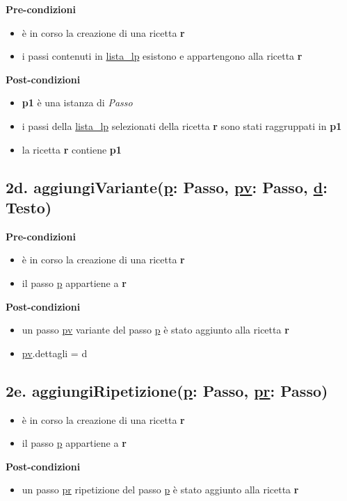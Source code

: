 \documentclass[12pt]{extarticle}
\begin{document}
\textbf{Pre-condizioni}
\begin{itemize}
  \item è in corso la creazione di una ricetta  \textbf{r}
  \item i passi contenuti in \underline{lista\_lp} esistono e appartengono alla ricetta \textbf{r}
\end{itemize}
\textbf{Post-condizioni}
\begin{itemize}
  \item \textbf{p1} è una istanza di \textit{Passo}
  \item i passi della \underline{lista\_lp} selezionati della ricetta  \textbf{r} sono stati raggruppati in \textbf{p1}
  \item  la ricetta \textbf{r} contiene  \textbf{p1}
\end{itemize}

\subsection*{2d. aggiungiVariante(\underline{p}: Passo, \underline{pv}: Passo, \underline{d}: Testo)}

\textbf{Pre-condizioni}
\begin{itemize}
  \item è in corso la creazione di una ricetta  \textbf{r}
  \item il passo \underline{p} appartiene a \textbf{r}
\end{itemize}
\textbf{Post-condizioni}
\begin{itemize}
  \item un passo  \underline{pv} variante del passo \underline{p} è stato aggiunto alla ricetta  \textbf{r}
  \item \underline{pv}.dettagli = d
\end{itemize}

\subsection*{2e. aggiungiRipetizione(\underline{p}: Passo, \underline{pr}: Passo)}
\begin{itemize}
  \item è in corso la creazione di una ricetta  \textbf{r}
  \item il passo \underline{p} appartiene a \textbf{r}
\end{itemize}
\textbf{Post-condizioni}
\begin{itemize}
  \item un passo \underline{pr} ripetizione del passo \underline{p} è stato aggiunto alla ricetta  \textbf{r}
\end{itemize}
\end{document}
